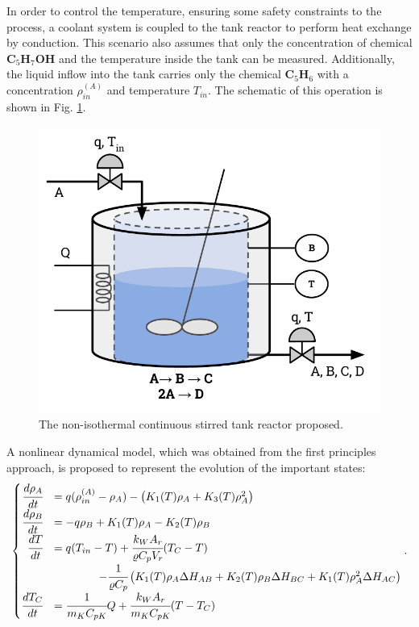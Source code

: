 \documentclass[a4paper,11pt]{book}
\numberwithin{figure}{chapter}
\numberwithin{equation}{chapter}
\numberwithin{table}{chapter}
\theoremstyle{definition}
\begin{document}
In order to control the temperature, ensuring some safety constraints to the process, a coolant system is coupled to the tank reactor to perform heat exchange by conduction. This scenario also assumes that only the concentration of chemical $\textbf{C}_5 \textbf{H}_7 \textbf{OH}$ and the temperature inside the tank can be measured. Additionally, the liquid inflow into the tank carries only the chemical $\textbf{C}_5 \textbf{H}_6$ with a concentration $\rho^{(A)}_{in}$ and temperature $T_{in}$. The schematic of this operation is shown in Fig. \ref{fig:methodology01}. 

\begin{figure}[ht] \centering
	\includegraphics[scale=0.75]{chapter6/exoCSTR}
	\caption{The non-isothermal continuous stirred tank reactor proposed.}
	\label{fig:methodology01}
\end{figure}

A nonlinear dynamical model, which was obtained from the first principles approach, is proposed to represent the evolution of the important states:
\begin{align} \label{eq:engellModel}
\begin{cases}
	\hfill \cfrac{d \rho_A}{dt} &= q (\rho^{(A)}_{in} - \rho_A) - \left( K_1(T) \rho_A + K_3(T) \rho^2_A  \right) \\
	\hfill \cfrac{d \rho_B}{dt} &= - q \rho_B + K_1(T) \rho_A - K_2(T) \rho_B \\
	\hfill \cfrac{d T}{dt} &= q(T_{in} - T) + \cfrac{k_W A_r}{\varrho C_p V_r} (T_C - T) \\ & \ \ \ \ \ \ \ \ \ \ \ \ -\cfrac{1}{\varrho C_p} \left( K_1(T) \rho_A \Delta H_{AB} + K_2(T) \rho_B \Delta H_{BC} + K_1(T) \rho_A^2 \Delta H_{AC} \right) \\
	\hfill \cfrac{d T_C}{dt} &= \cfrac{1}{m_K C_{pK}} Q + \cfrac{k_W A_r}{m_K C_{pK}} (T - T_C) 
\end{cases}
.\end{align}
\end{document}
